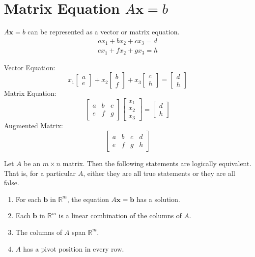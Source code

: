 \documentclass{article}
\begin{document}
\section*{Matrix Equation $A\mathbf{x}=b$}
$A\mathbf{x}=b$ can be represented as a vector or matrix equation.
\[\begin{split}
    ax_1+bx_2+cx_3=d \\
    ex_1+fx_2+gx_3=h
\end{split}\]

Vector Equation:
\[x_1\begin{bmatrix} a \\ e \end{bmatrix} + x_2\begin{bmatrix} b \\ f \end{bmatrix} + x_3
\begin{bmatrix} c \\ h \end{bmatrix} = \begin{bmatrix} d \\ h \end{bmatrix}\]
Matrix Equation:
\[\begin{bmatrix} a & b & c \\ e & f & g \end{bmatrix}
\begin{bmatrix} x_1 \\ x_2 \\ x_3 \end{bmatrix} = \begin{bmatrix} d \\ h \end{bmatrix}\]
Augmented Matrix:
\[\begin{bmatrix}
    a & b & c & d \\
    e & f & g & h
\end{bmatrix}\]

Let $A$ be an $m \times n$ matrix. Then the following statements are logically equivalent. That is,
for a particular $A$, either they are all true statements or they are all false.
\begin{enumerate}
    \item For each $\textbf{b}$ in $\mathbb{R}^m$, the equation $A\mathbf{x}=\mathbf{b}$ has a
    solution.
    \item Each $\textbf{b}$ in $\mathbb{R}^m$ is a linear combination of the columns of $A$.
    \item The columns of $A$ span $\mathbb{R}^m$.
    \item $A$ has a pivot position in every row.
\end{enumerate}
\end{document}

